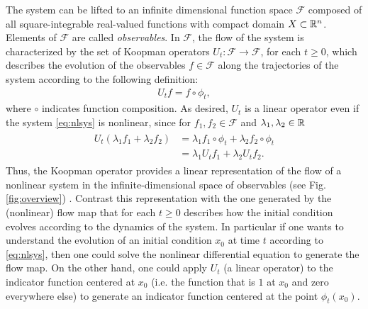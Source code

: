 The system can be lifted to an infinite dimensional function space $\mathcal{F}$ composed of all square-integrable real-valued functions with compact domain $X \subset \mathbb{R}^n$.
Elements of $\mathcal{F}$ are called \emph{observables}.
In $\mathcal{F}$, the flow of the system is characterized by the set %
of Koopman operators 
$U_t : \mathcal{F} \to \mathcal{F}$, for each $t \geq 0$,
which describes the evolution of the observables ${f \in \mathcal{F}}$ along the trajectories of the system according to the following definition:
\begin{align}
    U_t f = f \circ \phi_t,      
    \label{eq:koopman}
\end{align}
where $\circ$ indicates function composition.
As desired, $U_t$ is a linear operator even if the system \eqref{eq:nlsys} is nonlinear, since for $f_1, f_2 \in \mathcal{F}$ and $\lambda_1, \lambda_2 \in \mathbb{R}$
\begin{align}
    \begin{split}
    U_t (\lambda_1 f_1 + \lambda_2 f_2) &= \lambda_1 f_1 \circ \phi_t + \lambda_2 f_2 \circ \phi_t \\
    &= \lambda_1 U_t f_1 + \lambda_2 U_t f_2.
    \end{split}
\end{align}
Thus, the Koopman operator provides a linear representation of the flow of a nonlinear system in the infinite-dimensional space of observables (see Fig. \ref{fig:overview}) \cite{budivsic2012applied}.
Contrast this representation with the one generated by the (nonlinear) flow map that for each $t \geq 0$ describes how the initial condition evolves according to the dynamics of the system.
In particular if one wants to understand the evolution of an initial condition $x_0$ at time $t$ according to \eqref{eq:nlsys}, then one could solve the nonlinear differential equation to generate the flow map. 
On the other hand, one could apply $U_t$ (a linear operator) to the indicator function centered at $x_0$ (i.e. the function that is $1$ at $x_0$ and zero everywhere else) to generate an indicator function centered at the point $\phi_t(x_0)$.


